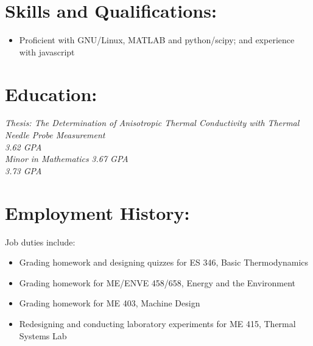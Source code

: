 \documentclass{resume}
\author{ Joshua Holbrook }
\begin{document}
\maketitle

\section{Skills and Qualifications:}
\small
\begin{itemize}
    \item Proficient with GNU/Linux, MATLAB and python/scipy; and experience with javascript

\end{itemize}
\normalsize

\section{Education:}
        \textit{Thesis: The Determination of Anisotropic Thermal Conductivity with Thermal Needle Probe Measurement}\\
        \emph{ 3.62 GPA}\\
        
        \textit{Minor in Mathematics}
        \emph{ 3.67 GPA}\\
        
        \emph{ 3.73 GPA}\\


\section{Employment History:}
    \normalsize
    Job duties include:
    \small
    \begin{itemize}
        \item Grading homework and designing quizzes for ES 346, Basic Thermodynamics
        \item Grading homework for ME/ENVE 458/658, Energy and the Environment
        \item Grading homework for ME 403, Machine Design
        \item Redesigning and conducting laboratory experiments for ME 415, Thermal Systems Lab
    \end{itemize}
    \normalsize
    \medskip
\end{document}

